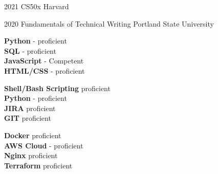 \documentclass[9pt]{developercv} %
\begin{document}


\begin{entrylist}
	\entry
		{2021}
		{CS50x}
		{Harvard}

	\entry
		{2020}
		{Fundamentals of Technical Writing}
		{Portland State University}
		
\end{entrylist}


\begin{minipage}[t]{0.3\textwidth}
	\vspace{-\baselineskip} %

	\textbf{Python} - proficient\\
	\textbf{SQL} - proficient\\
	\textbf{JavaScript} - Competent\\
	\textbf{HTML/CSS} - proficient\\
\end{minipage}
\hfill
\begin{minipage}[t]{0.3\textwidth}
	\vspace{-\baselineskip} %
	
	\textbf{Shell/Bash Scripting}  proficient\\
	\textbf{Python} - proficient\\
	\textbf{JIRA}  proficient\\
	\textbf{GIT}  proficient\\
\end{minipage}
\hfill
\begin{minipage}[t]{0.3\textwidth}
	\vspace{-\baselineskip} %
	
	\textbf{Docker}  proficient\\
	\textbf{AWS Cloud} - proficient\\
	\textbf{Nginx}  proficient\\
	\textbf{Terraform}  proficient\\
\end{minipage}

\end{document}
